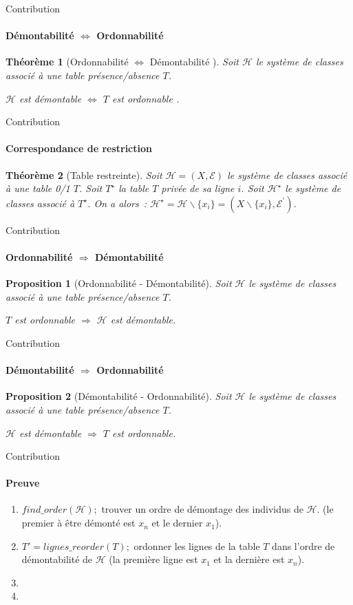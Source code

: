 \documentclass{beamer}
\newtheorem{proposition}{Proposition}
\newtheorem{theo}{Théorème}
\begin{document}
  \begin{frame}{Contribution}
  \framesubtitle{Démontabilité $\Leftrightarrow$ Ordonnabilité}
  \begin{theo}[Ordonnabilité $\Leftrightarrow$ Démontabilité ]
  Soit $\mathcal{H}$ le système de classes associé à une table présence/absence $T$.

  $\mathcal{H}$ est démontable $\Leftrightarrow$ $T$ est ordonnable .  
  \end{theo}
  \end{frame}

  \begin{frame}{Contribution}
  \framesubtitle{Correspondance de restriction}
  \begin{theo}[Table restreinte]
  Soit $\mathcal{H} = (X, \mathcal{E})$ le système de classes associé à une table 0/1 $T$.
  Soit $T^{\star}$ la table $T$ privée de sa ligne $i$.
  Soit $\mathcal{H}^{\star}$ le système de classes associé à $T^{\star}$.
  On a alors~: 
  $\mathcal{H}^{\star} = \mathcal{H} \backslash \{x_i\}  =(X \backslash \{x_i\} , \mathcal{E}^{'})$.
  \end{theo}
  \end{frame}

  \begin{frame}{Contribution}
  \framesubtitle{Ordonnabilité $\Rightarrow$ Démontabilité}
  \begin{proposition}[Ordonnabilité - Démontabilité]
  Soit $\mathcal{H}$ le système de classes associé à une table présence/absence $T$.

  $T$ est ordonnable $\Rightarrow$ $\mathcal{H}$ est démontable. 
  \end{proposition}
  \end{frame}

  \begin{frame}{Contribution}
  \framesubtitle{Démontabilité $\Rightarrow$ Ordonnabilité}
  \begin{proposition}[Démontabilité - Ordonnabilité]
  Soit $\mathcal{H}$ le système de classes associé à une table présence/absence $T$.

  $\mathcal{H}$ est démontable $\Rightarrow$ $T$ est ordonnable. 
  \end{proposition}
  \end{frame}

  \begin{frame}{Contribution}
  \framesubtitle{Preuve}

\begin{enumerate}
\item $find\_order(\mathcal{H});$ trouver un ordre de démontage des individus de $\mathcal{H}$. (le premier à être démonté est $x_n$ et le dernier $x_1$).
\item $T' = lignes\_reorder(T);$ ordonner les lignes de la table $T$ dans l'ordre de démontabilité de $\mathcal{H}$ (la première ligne est $x_1$ et la dernière est $x_n$).
\item
\item 
\end{enumerate}

  \end{frame}
\end{document}
